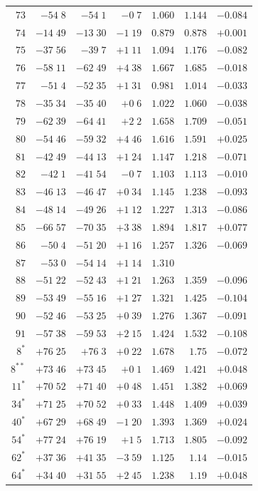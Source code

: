 \begin{center}
\begin{tabular}{r||r|r|r||r|r|r}
$73$&$-54\;8$&$-54\;1$&$-0\;7$&$1.060$&$1.144$&$-0.084$\\
$74$&$-14\;49$&$-13\;30$&$-1\;19$&$0.879$&$0.878$&$+0.001$\\
$75$&$-37\;56$&$-39\;7$&$+1\;11$&$1.094$&$1.176$&$-0.082$\\
$76$&$-58\;11$&$-62\;49$&$+4\;38$&$1.667$&$1.685$&$-0.018$\\
$77$&$-51\;4$&$-52\;35$&$+1\;31$&$0.981$&$1.014$&$-0.033$\\
$78$&$-35\;34$&$-35\;40$&$+0\;6$&$1.022$&$1.060$&$-0.038$\\
$79$&$-62\;39$&$-64\;41$&$+2\;2$&$1.658$&$1.709$&$-0.051$\\
$80$&$-54\;46$&$-59\;32$&$+4\;46$&$1.616$&$1.591$&$+0.025$\\[2pt]
$81$&$-42\;49$&$-44\;13$&$+1\;24$&$1.147$&$1.218$&$-0.071$\\
$82$&$-42\;1$&$-41\;54$&$-0\;7$&$1.103$&$1.113$&$-0.010$\\
$83$&$-46\;13$&$-46\;47$&$+0\;34$&$1.145$&$1.238$&$-0.093$\\
$84$&$-48\;14$&$-49\;26$&$+1\;12$&$1.227$&$1.313$&$-0.086$\\
$85$&$-66\;57$&$-70\;35$&$+3\;38$&$1.894$&$1.817$&$+0.077$\\
$86$&$-50\;4$&$-51\;20$&$+1\;16$&$1.257$&$1.326$&$-0.069$\\
$87$&$-53\;0$&$-54\;14$&$+1\;14$&$1.310$&&\\
$88$&$-51\;22$&$-52\;43$&$+1\;21$&$1.263$&$1.359$&$-0.096$\\
$89$&$-53\;49$&$-55\;16$&$+1\;27$&$1.321$&$1.425$&$-0.104$\\
$90$&$-52\;46$&$-53\;25$&$+0\;39$&$1.276$&$1.367$&$-0.091$\\[2pt]
$91$&$-57\;38$&$-59\;53$&$+2\;15$&$1.424$&$1.532$&$-0.108$\\[2pt]
$8^{\ast}$&$+76\;25$&$+76\;3$&$+0\;22$&$1.678$&$1.75$&$-0.072$\\
$8^{\ast\ast}$&$+73\;46$&$+73\;45$&$+0\;1$&$1.469$&$1.421$&$+0.048$\\
$11^{\ast}$&$+70\;52$&$+71\;40$&$+0\;48$&$1.451$&$1.382$&$+0.069$\\
$34^{\ast}$&$+71\;25$&$+70\;52$&$+0\;33$&$1.448$&$1.409$&$+0.039$\\
$40^{\ast}$&$+67\;29$&$+68\;49$&$-1\;20$&$1.393$&$1.369$&$+0.024$\\
$54^{\ast}$&$+77\;24$&$+76\;19$&$+1\;5$&$1.713$&$1.805$&$-0.092$\\
$62^{\ast}$&$+37\;36$&$+41\;35$&$-3\;59$&$1.125$&$1.14$&$-0.015$\\
$64^{\ast}$&$+34\;40$&$+31\;55$&$+2\;45$&$1.238$&$1.19$&$+0.048$\\
\hline
\end{tabular}
\end{center}
\endgroup

\clearpage
